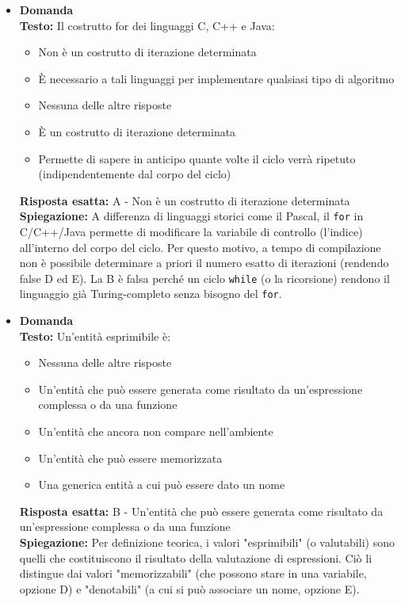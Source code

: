 \documentclass[12pt, a4paper]{article}
\newcounter{domandateoria}
\begin{document}
\begin{itemize}
    \item {}\textbf{Domanda \thedomandateoria} \\
    \textbf{Testo:} Il costrutto for dei linguaggi C, C++ e Java:
    \begin{itemize}
        \item[A)] Non è un costrutto di iterazione determinata
        \item[B)] È necessario a tali linguaggi per implementare qualsiasi tipo di algoritmo
        \item[C)] Nessuna delle altre risposte
        \item[D)] È un costrutto di iterazione determinata
        \item[E)] Permette di sapere in anticipo quante volte il ciclo verrà ripetuto (indipendentemente dal corpo del ciclo)
    \end{itemize}
    \textbf{Risposta esatta:} A - Non è un costrutto di iterazione determinata \\
    \textbf{Spiegazione:} A differenza di linguaggi storici come il Pascal, il \texttt{for} in C/C++/Java permette di modificare la variabile di controllo (l'indice) all'interno del corpo del ciclo. Per questo motivo, a tempo di compilazione non è possibile determinare a priori il numero esatto di iterazioni (rendendo false D ed E). La B è falsa perché un ciclo \texttt{while} (o la ricorsione) rendono il linguaggio già Turing-completo senza bisogno del \texttt{for}.
    \vspace{0.3cm}

    \item {}\textbf{Domanda \thedomandateoria} \\
    \textbf{Testo:} Un'entità esprimibile è:
    \begin{itemize}
        \item[A)] Nessuna delle altre risposte
        \item[B)] Un'entità che può essere generata come risultato da un'espressione complessa o da una funzione
        \item[C)] Un'entità che ancora non compare nell'ambiente
        \item[D)] Un'entità che può essere memorizzata
        \item[E)] Una generica entità a cui può essere dato un nome
    \end{itemize}
    \textbf{Risposta esatta:} B - Un'entità che può essere generata come risultato da un'espressione complessa o da una funzione \\
    \textbf{Spiegazione:} Per definizione teorica, i valori "esprimibili" (o valutabili) sono quelli che costituiscono il risultato della valutazione di espressioni. Ciò li distingue dai valori "memorizzabili" (che possono stare in una variabile, opzione D) e "denotabili" (a cui si può associare un nome, opzione E). 
    \vspace{0.3cm}


\end{itemize}
\end{document}
